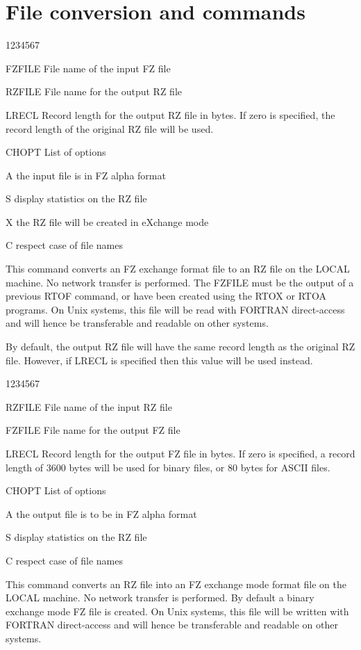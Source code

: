 \section{File conversion and commands}
\begin{DLtt}{1234567}
\item[FZFILE]File name of the input FZ file
\item[RZFILE]File name for the output RZ file
\item[LRECL]Record length for the output RZ file in bytes. If zero is
specified, the record length of the original RZ file will be used.
\item[CHOPT]List of options
\begin{DLtt}{12}
\item[A]the input file is in FZ alpha format
\item[S]display statistics on the RZ file
\item[X]the RZ file will be created in eXchange mode
\item[C]respect case of file names
\end{DLtt}
\end{DLtt}
This command converts an FZ exchange format file to an
RZ file on the LOCAL machine. No network transfer is
performed. The FZFILE must be the output of a previous
RTOF command, or have been created using the RTOX or RTOA
programs. On Unix systems, this file will be read with
FORTRAN direct-access and will hence be transferable and
readable on other systems.

By default, the output RZ file will have the same record
length as the original RZ file. However, if LRECL is
specified then this value will be used instead.
\begin{DLtt}{1234567}
\item[RZFILE]File name of the input RZ file
\item[FZFILE]File name for the output FZ file
\item[LRECL]Record length for the output FZ file in bytes. If zero is
specified, a record length of 3600 bytes will be used for binary files,
or 80 bytes for ASCII files.
\item[CHOPT]List of options
\begin{DLtt}{12}
\item[A]the output file is to be in FZ alpha format
\item[S]display statistics on the RZ file
\item[C]respect case of file names
\end{DLtt}
\end{DLtt}
This command converts an RZ file into an FZ exchange mode
format file on the LOCAL machine. No network transfer is
performed. By default a binary exchange mode FZ file is
created. On Unix systems, this file will be written with
FORTRAN direct-access and will hence be transferable and
readable on other systems.


